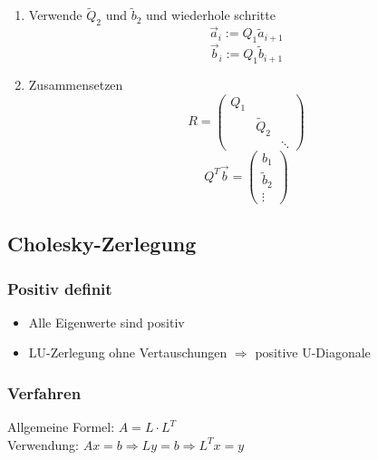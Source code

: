 \begin{enumerate}
	\item Verwende $\widetilde{Q}_2$ und $\widetilde{b}_2$ und wiederhole schritte
	\begin{equation*}
		\vec{a}_i := Q_1\widetilde{a}_{i+1}
	\end{equation*}
	\begin{equation*}
		\vec{b}_i := Q_1\widetilde{b}_{i+1}
	\end{equation*}
	
	\item Zusammensetzen
	\begin{displaymath}
		R =
		\begin{pmatrix}
			Q_1 & & \\
			& \widetilde{Q}_2 & \\
			& & \ddots
		\end{pmatrix}
	\end{displaymath}
	\begin{displaymath}
		Q^T \vec{b} =
		\begin{pmatrix}
			b_1 \\
			\widetilde{b}_2 \\
			\vdots
		\end{pmatrix}
	\end{displaymath}

\end{enumerate}

\subsection{Cholesky-Zerlegung}

\subsubsection*{Positiv definit}
\begin{itemize}
	
	\item Alle Eigenwerte sind positiv
	
	\item LU-Zerlegung ohne Vertauschungen $\Rightarrow$ positive U-Diagonale
	
\end{itemize}

\subsubsection*{Verfahren}
Allgemeine Formel: $A = L \cdot L^T$ \\
Verwendung: $Ax = b \Rightarrow Ly = b \Rightarrow L^Tx = y$


